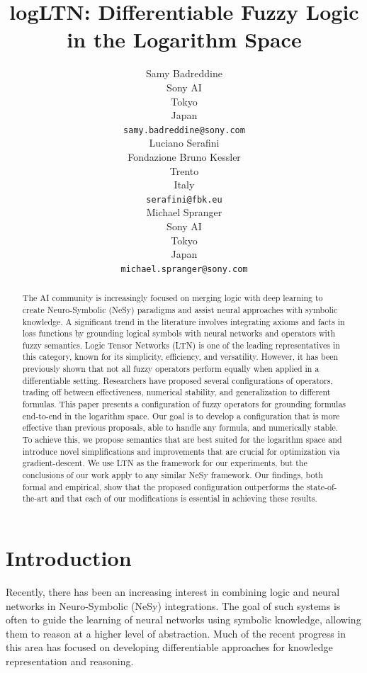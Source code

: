 \documentclass{article}
\title{logLTN: Differentiable Fuzzy Logic in the Logarithm Space}
\author{%
  Samy Badreddine\\
  Sony AI\\
  Tokyo\\
  Japan \\
  \texttt{samy.badreddine@sony.com} \\
  \And
  Luciano Serafini\\
  Fondazione Bruno Kessler\\
  Trento\\
  Italy \\
  \texttt{serafini@fbk.eu} \\
  \And
  Michael Spranger\\
  Sony AI\\
  Tokyo\\
  Japan \\
  \texttt{michael.spranger@sony.com} \\
}
\theoremstyle{definition}
\begin{document}
\maketitle

\begin{abstract}
    The AI community is increasingly focused on merging logic with deep learning to create Neuro-Symbolic (NeSy) paradigms and assist neural approaches with symbolic knowledge.
    A significant trend in the literature involves integrating axioms and facts in loss functions by grounding logical symbols with neural networks 
    and operators with fuzzy semantics. 
    Logic Tensor Networks (LTN) is one of the leading representatives in this category, known for its simplicity, efficiency, and versatility.
    However, it has been previously shown that not all fuzzy operators perform equally when applied in a differentiable setting. 
    Researchers have proposed several configurations of operators, trading off between effectiveness, numerical stability, and generalization to different formulas. 
    This paper presents a configuration of fuzzy operators for grounding formulas end-to-end in the logarithm space.
    Our goal is to develop a configuration that is more effective than previous proposals, able to handle any formula, and numerically stable. 
    To achieve this, we propose semantics that are best suited for the logarithm space and introduce novel simplifications and improvements that are crucial for optimization via gradient-descent.
    We use LTN as the framework for our experiments, but the conclusions of our work apply to any similar NeSy framework. 
    Our findings, both formal and empirical, show that the proposed configuration outperforms the state-of-the-art and that each of our modifications is essential in achieving these results.
\end{abstract}



\section{Introduction}
Recently, there has been an increasing interest in combining logic and neural networks in Neuro-Symbolic (NeSy) integrations. 
The goal of such systems is often to guide the learning of neural networks using symbolic knowledge, allowing them to reason at a higher level of abstraction. 
Much of the recent progress in this area has focused on developing differentiable approaches for knowledge representation and reasoning. 
\end{document}
